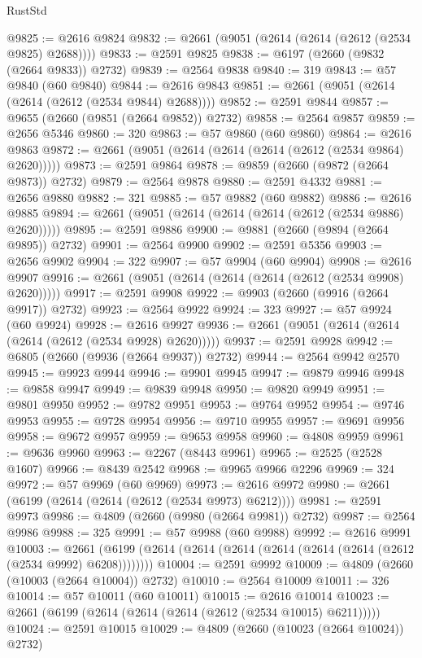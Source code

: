 \begin{lexlean}{RustStd}
\begin{coremodule}
@9825 := @2616 @9824
@9832 := @2661 (@9051 (@2614 (@2614 (@2612 (@2534 @9825) @2688))))
@9833 := @2591 @9825
@9838 := @6197 (@2660 (@9832 (@2664 @9833)) @2732)
@9839 := @2564 @9838
@9840 := 319
@9843 := @57 @9840 (@60 @9840)
@9844 := @2616 @9843
@9851 := @2661 (@9051 (@2614 (@2614 (@2612 (@2534 @9844) @2688))))
@9852 := @2591 @9844
@9857 := @9655 (@2660 (@9851 (@2664 @9852)) @2732)
@9858 := @2564 @9857
@9859 := @2656 @5346
@9860 := 320
@9863 := @57 @9860 (@60 @9860)
@9864 := @2616 @9863
@9872 := @2661 (@9051 (@2614 (@2614 (@2614 (@2612 (@2534 @9864) @2620)))))
@9873 := @2591 @9864
@9878 := @9859 (@2660 (@9872 (@2664 @9873)) @2732)
@9879 := @2564 @9878
@9880 := @2591 @4332
@9881 := @2656 @9880
@9882 := 321
@9885 := @57 @9882 (@60 @9882)
@9886 := @2616 @9885
@9894 := @2661 (@9051 (@2614 (@2614 (@2614 (@2612 (@2534 @9886) @2620)))))
@9895 := @2591 @9886
@9900 := @9881 (@2660 (@9894 (@2664 @9895)) @2732)
@9901 := @2564 @9900
@9902 := @2591 @5356
@9903 := @2656 @9902
@9904 := 322
@9907 := @57 @9904 (@60 @9904)
@9908 := @2616 @9907
@9916 := @2661 (@9051 (@2614 (@2614 (@2614 (@2612 (@2534 @9908) @2620)))))
@9917 := @2591 @9908
@9922 := @9903 (@2660 (@9916 (@2664 @9917)) @2732)
@9923 := @2564 @9922
@9924 := 323
@9927 := @57 @9924 (@60 @9924)
@9928 := @2616 @9927
@9936 := @2661 (@9051 (@2614 (@2614 (@2614 (@2612 (@2534 @9928) @2620)))))
@9937 := @2591 @9928
@9942 := @6805 (@2660 (@9936 (@2664 @9937)) @2732)
@9944 := @2564 @9942 @2570
@9945 := @9923 @9944
@9946 := @9901 @9945
@9947 := @9879 @9946
@9948 := @9858 @9947
@9949 := @9839 @9948
@9950 := @9820 @9949
@9951 := @9801 @9950
@9952 := @9782 @9951
@9953 := @9764 @9952
@9954 := @9746 @9953
@9955 := @9728 @9954
@9956 := @9710 @9955
@9957 := @9691 @9956
@9958 := @9672 @9957
@9959 := @9653 @9958
@9960 := @4808 @9959
@9961 := @9636 @9960
@9963 := @2267 (@8443 @9961)
@9965 := @2525 (@2528 @1607)
@9966 := @8439 @2542
@9968 := @9965 @9966 @2296
@9969 := 324
@9972 := @57 @9969 (@60 @9969)
@9973 := @2616 @9972
@9980 := @2661 (@6199 (@2614 (@2614 (@2612 (@2534 @9973) @6212))))
@9981 := @2591 @9973
@9986 := @4809 (@2660 (@9980 (@2664 @9981)) @2732)
@9987 := @2564 @9986
@9988 := 325
@9991 := @57 @9988 (@60 @9988)
@9992 := @2616 @9991
@10003 := @2661 (@6199 (@2614 (@2614 (@2614 (@2614 (@2614 (@2614 (@2612 (@2534 @9992) @6208))))))))
@10004 := @2591 @9992
@10009 := @4809 (@2660 (@10003 (@2664 @10004)) @2732)
@10010 := @2564 @10009
@10011 := 326
@10014 := @57 @10011 (@60 @10011)
@10015 := @2616 @10014
@10023 := @2661 (@6199 (@2614 (@2614 (@2614 (@2612 (@2534 @10015) @6211)))))
@10024 := @2591 @10015
@10029 := @4809 (@2660 (@10023 (@2664 @10024)) @2732)

\end{coremodule}
\end{lexlean}
